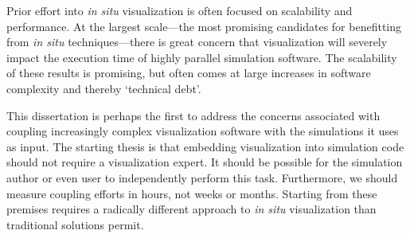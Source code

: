 
Prior effort into \textit{in situ} visualization is often focused on
scalability and performance.  At the largest scale---the most promising
candidates for benefitting from \textit{in situ} techniques---there is
great concern that visualization will severely impact the execution
time of highly parallel simulation software.  The scalability of these
results is promising, but often comes at large increases in software
complexity and thereby `technical debt'.


This dissertation is perhaps the first to address the concerns
associated with coupling increasingly complex visualization software
with the simulations it uses as input.  The starting thesis is that
embedding visualization into simulation code should not require a
visualization expert.  It should be possible for the simulation
author or even user to independently perform this task.  Furthermore,
we should measure coupling efforts in hours, not weeks or months.
Starting from
these premises requires a radically different approach to \textit{in
situ} visualization than traditional solutions permit.


